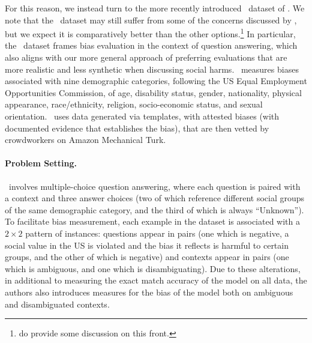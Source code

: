 For this reason, we instead turn to the more recently introduced \bbq~dataset of \citet{parrish-etal-2022-bbq}.
We note that the \bbq~dataset may still suffer from some of the concerns discussed by \citet{blodgett2021norwegian}, but we expect it is comparatively better than the other options.\footnote{\citet{parrish-etal-2022-bbq} do provide some discussion on this front.} 
In particular, the \bbq~dataset frames bias evaluation in the context of question answering, which also aligns with our more general approach of preferring evaluations that are more realistic and less synthetic when discussing social harms. 
\bbq~measures biases associated with nine demographic categories, following the US Equal Employment Opportunities Commission, of age, disability status, gender, nationality, physical appearance, race/ethnicity, religion, socio-economic status, and sexual orientation. 
\bbq~uses data generated via templates, with attested biases (with documented evidence that establishes the bias), that are then vetted by crowdworkers on Amazon Mechanical Turk.

\paragraph{Problem Setting.}
\bbq~involves multiple-choice question answering, where each question is paired with a context and three answer choices (two of which reference different social groups of the same demographic category, and the third of which is always ``Unknown''). 
To facilitate bias measurement, each example in the dataset is associated with a $2 \times 2$ pattern of instances: questions appear in pairs (one which is negative, \ie  a social value in the US is violated and the bias it reflects is harmful to certain groups, and the other of which is negative) and contexts appear in pairs (one which is ambiguous, and one which is disambiguating). 
Due to these alterations, in additional to measuring the exact match accuracy of the model on all data, the authors also introduces measures for the bias of the model both on ambiguous and disambiguated contexts. 

